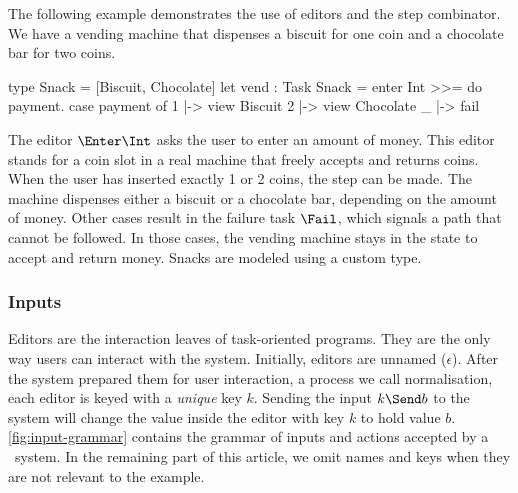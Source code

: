 \begin{example}
  \label{exm:vending-base}
  The following example demonstrates the use of editors and the step combinator.
  We have a vending machine that dispenses a biscuit for one coin and a chocolate bar for two coins.
  \begin{TASK}[emph={payment}]
    type Snack = [Biscuit, Chocolate]
    let vend : Task Snack = enter Int >>= do payment.
      case payment of
        1 |-> view Biscuit
        2 |-> view Chocolate
        _ |-> fail
  \end{TASK}
  The editor $\Enter \Int$ asks the user to enter an amount of money.
  This editor stands for a coin slot in a real machine that freely accepts and returns coins.
  When the user has inserted exactly 1 or 2 coins, the step can be made.
  The machine dispenses either a biscuit or a chocolate bar, depending on the amount of money.
  Other cases result in the failure task $\Fail$, which signals a path that cannot be followed.
  In those cases, the vending machine stays in the state to accept and return money.
  Snacks are modeled using a custom type.
\end{example}


\subsubsection{Inputs}
\label{sub:inputs}

Editors are the interaction leaves of task-oriented programs.
They are the only way users can interact with the system.
Initially, editors are unnamed ($\epsilon$).
After the system prepared them for user interaction, a process we call normalisation,
each editor is keyed with a \emph{unique} key $k$.
Sending the input $k \Send b$ to the system will change the value inside the editor with key $k$ to hold value $b$.
\cref{fig:input-grammar} contains the grammar of inputs and actions accepted by a \TOPHAT\ system.
In the remaining part of this article,
we omit names and keys when they are not relevant to the example.

